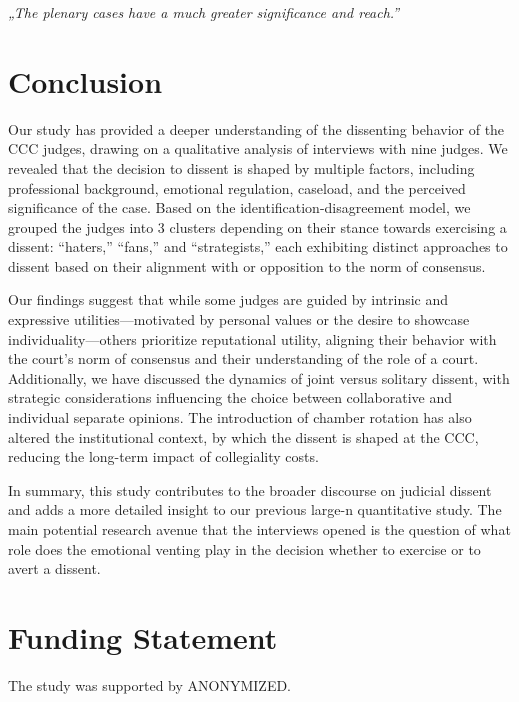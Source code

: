 \documentclass[
  11pt,
]{article}
\begin{document}
\emph{„The plenary cases have a much greater significance and reach.''}

\section{Conclusion}\label{conclusion}

Our study has provided a deeper understanding of the dissenting behavior of the CCC judges, drawing on a qualitative analysis of interviews with nine judges. We revealed that the decision to dissent is shaped by multiple factors, including professional background, emotional regulation, caseload, and the perceived significance of the case. Based on the identification-disagreement model, we grouped the judges into 3 clusters depending on their stance towards exercising a dissent: ``haters,'' ``fans,'' and ``strategists,'' each exhibiting distinct approaches to dissent based on their alignment with or opposition to the norm of consensus.

Our findings suggest that while some judges are guided by intrinsic and expressive utilities---motivated by personal values or the desire to showcase individuality---others prioritize reputational utility, aligning their behavior with the court's norm of consensus and their understanding of the role of a court. Additionally, we have discussed the dynamics of joint versus solitary dissent, with strategic considerations influencing the choice between collaborative and individual separate opinions. The introduction of chamber rotation has also altered the institutional context, by which the dissent is shaped at the CCC, reducing the long-term impact of collegiality costs.

In summary, this study contributes to the broader discourse on judicial dissent and adds a more detailed insight to our previous large-n quantitative study. The main potential research avenue that the interviews opened is the question of what role does the emotional venting play in the decision whether to exercise or to avert a dissent.

\section*{Funding Statement}\label{funding-statement}

The study was supported by ANONYMIZED.
\end{document}

